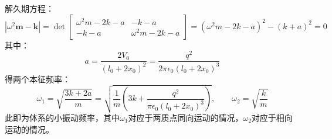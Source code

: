 \documentclass[a4paper,fontset=windows]{ctexart}
\begin{document}
\begin{itemize}
        解久期方程：
        \[
        \left|\omega^2\boldsymbol{m}- \boldsymbol{k}\right|
        = \det
        \begin{bmatrix}
            \omega^{2}m-2k-a & -k-a \\
            -k-a & \omega^{2}m-2k-a
        \end{bmatrix}
        = (\omega^{2}m-2k-a)^2 - (k+a)^2
        = 0
        \]
        其中：
        \[
        a = \frac{2V_0}{(l_0+2x_0)^2} = \frac{q^2}{2\pi\epsilon_0(l_0+2x_0)^3}
        \]
        得两个本征频率：
        \[
        \omega_1 = \sqrt{\frac{3k+2a}{m}} = \sqrt{\frac{1}{m}\left(3k+\frac{q^2}{\pi\epsilon_0(l_0+2x_0)^3}\right)},\qquad \omega_2 = \sqrt{\frac{k}{m}}
        \]
        此即为体系的小振动频率，其中$\omega_1$对应于两质点同向运动的情况，$\omega_2$对应于相向运动的情况。
        \bigskip


\end{itemize}
\end{document}
